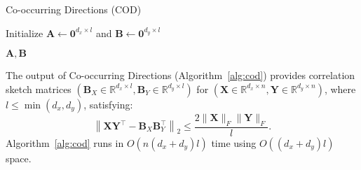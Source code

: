 \begin{algorithm}[t]
    \caption{Co-occurring Directions (COD)}
    \label{alg:cod}
    \DontPrintSemicolon
    
    Initialize \(\boldsymbol{A} \leftarrow \boldsymbol{0}^{d_x\times l}\) and \(\boldsymbol{B} \leftarrow \boldsymbol{0}^{d_y\times l}\)\;
    
    
    \Return \(\boldsymbol{A}, \boldsymbol{B}\)
\end{algorithm}






\vspace{-1mm}
\begin{theorem} \label{thm:cod}
The output of Co-occurring Directions (Algorithm~\ref{alg:cod}) provides correlation sketch matrices \((\boldsymbol{B}_X \in \mathbb{R}^{d_x \times l}, \boldsymbol{B}_Y \in \mathbb{R}^{d_y \times l})\) for \((\boldsymbol{X} \in \mathbb{R}^{d_x \times n}, \boldsymbol{Y} \in \mathbb{R}^{d_y \times n})\), where \(l \leq \min(d_x, d_y)\), satisfying:
\[
\left\|\boldsymbol{X} \boldsymbol{Y}^\top - \boldsymbol{B}_X \boldsymbol{B}_Y^\top\right\|_2 \leq \frac{2\|\boldsymbol{X}\|_F \|\boldsymbol{Y}\|_F}{l}.
\]
Algorithm~\ref{alg:cod} runs in \(O(n(d_x + d_y)l)\) time using \(O((d_x + d_y)l)\) space.
\end{theorem}

